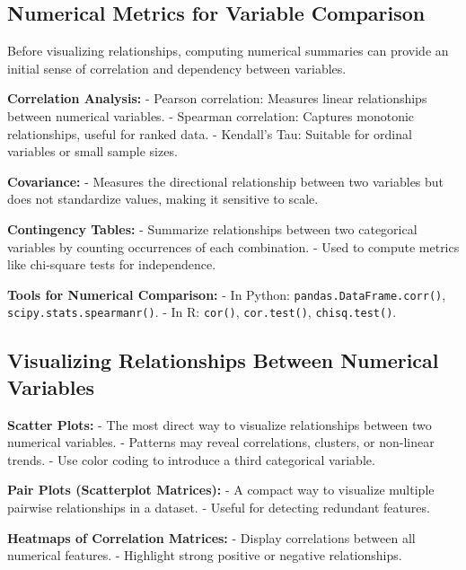 \documentclass[12pt,openany, draft]{book}
\begin{document}
\subsection{Numerical Metrics for Variable Comparison}

Before visualizing relationships, computing numerical summaries can provide an initial sense of correlation and dependency between variables.
\newline

\textbf{Correlation Analysis:}
- Pearson correlation: Measures linear relationships between numerical variables.
- Spearman correlation: Captures monotonic relationships, useful for ranked data.
- Kendall’s Tau: Suitable for ordinal variables or small sample sizes.
\newline

\textbf{Covariance:}
- Measures the directional relationship between two variables but does not standardize values, making it sensitive to scale.
\newline

\textbf{Contingency Tables:}
- Summarize relationships between two categorical variables by counting occurrences of each combination.
- Used to compute metrics like chi-square tests for independence.
\newline

\textbf{Tools for Numerical Comparison:}
- In Python: \texttt{pandas.DataFrame.corr()}, \texttt{scipy.stats.spearmanr()}.
- In R: \texttt{cor()}, \texttt{cor.test()}, \texttt{chisq.test()}.

\subsection{Visualizing Relationships Between Numerical Variables}

\textbf{Scatter Plots:}
- The most direct way to visualize relationships between two numerical variables.
- Patterns may reveal correlations, clusters, or non-linear trends.
- Use color coding to introduce a third categorical variable.
\newline

\textbf{Pair Plots (Scatterplot Matrices):}
- A compact way to visualize multiple pairwise relationships in a dataset.
- Useful for detecting redundant features.
\newline

\textbf{Heatmaps of Correlation Matrices:}
- Display correlations between all numerical features.
- Highlight strong positive or negative relationships.
\newline
\end{document}
